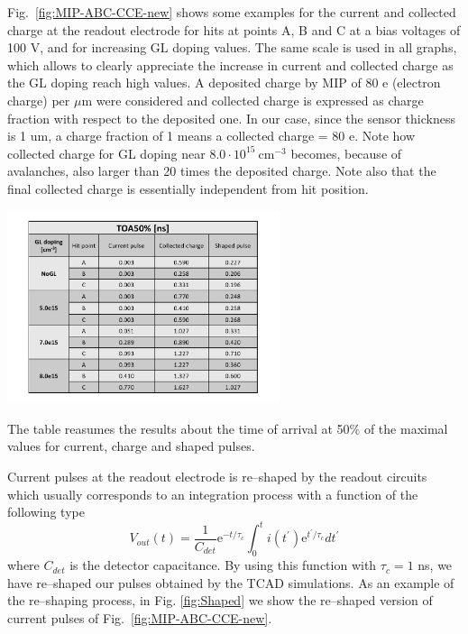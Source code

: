 \documentclass[aps,pt14,superscriptaddress,floatfix,nofootinbib]{revtex4}
\begin{document}
Fig.~\ref{fig:MIP-ABC-CCE-new} shows some examples for the current and collected charge at the readout electrode for hits at points A, B and C at a bias voltages of 100 V, and for increasing GL doping values. The same scale is used in all graphs, which allows to clearly appreciate the increase in current and collected charge as the GL doping reach high values. A deposited charge by MIP of 80 e (electron charge) per $\mu$m were considered and collected charge is expressed as charge fraction with respect to the deposited one. In our case, since the sensor thickness is 1 um, a charge fraction of 1 means a collected charge = 80 e. Note how collected charge
for GL doping near $8.0\cdot 10^{15}\ \mathrm{cm^{-3}}$ becomes, because of avalanches, also larger than 20 times the deposited charge. Note also that the final collected charge is essentially independent from hit position. 

\begin{table}[hbtp]
\begin{center}
\vspace{-0.5cm}
\includegraphics[width=0.6\textwidth,keepaspectratio]{figures1/Table_toa50.pdf}
\caption{The table reasumes the results about the time of arrival at 50\% of the maximal values for current, charge and shaped pulses.\label{Table_times}}
\end{center}
\end{table}
 
Current pulses at the readout electrode is re--shaped by the readout circuits which usually corresponds to an integration process with a function of the following type 
$$
V_{out}(t)=\frac{1}{C_{det}}\mathrm{e}^{-t/\tau_c}\int_0^t i(t^\prime)\mathrm{e}^{t^\prime/\tau_c}dt^\prime
$$
where $C_{det}$ is the detector capacitance. By using this function with $\tau_c=1$ ns, we have re--shaped our pulses obtained by the TCAD simulations. As an example of the re--shaping process, in Fig. \ref{fig:Shaped} we show the re--shaped version of current pulses of Fig.~\ref{fig:MIP-ABC-CCE-new}.
\end{document}
